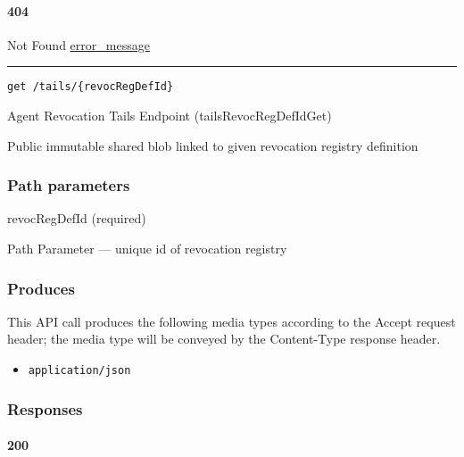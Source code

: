 \hypertarget{section-455}{%
\paragraph{404}\label{section-455}}

Not Found \protect\hyperlink{error_message}{error\_message}

\begin{center}\rule{0.5\linewidth}{\linethickness}\end{center}

\protect\hypertarget{tailsRevocRegDefIdGet}{}{}

\begin{verbatim}
get /tails/{revocRegDefId}
\end{verbatim}

Agent Revocation Tails Endpoint ({tailsRevocRegDefIdGet})

Public immutable shared blob linked to given revocation registry
definition

\hypertarget{path-parameters-76}{%
\subsubsection{Path parameters}\label{path-parameters-76}}

revocRegDefId (required)

{Path Parameter} --- unique id of revocation registry

\hypertarget{produces-137}{%
\subsubsection{Produces}\label{produces-137}}

This API call produces the following media types according to the
{Accept} request header; the media type will be conveyed by the
{Content-Type} response header.

\begin{itemize}
\tightlist
\item
  \texttt{application/json}
\end{itemize}

\hypertarget{responses-140}{%
\subsubsection{Responses}\label{responses-140}}

\hypertarget{section-456}{%
\paragraph{200}\label{section-456}}

